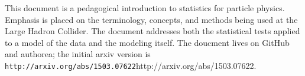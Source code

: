 This document is a pedagogical introduction to statistics for particle physics.  
Emphasis is placed on the terminology, concepts, and methods being used at the Large Hadron Collider.  
The document addresses both the statistical tests applied to a model of the data and the modeling itself.
The doucment lives on GitHub and authorea; the initial arxiv version is \verb|http://arxiv.org/abs/1503.07622|http://arxiv.org/abs/1503.07622.